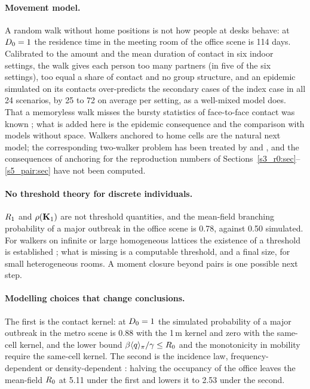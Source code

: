 \paragraph{Movement model.} A random walk without home positions is not how people at desks behave: at
$D_0=1$ the residence time in the meeting room of the office scene is 114 days. Calibrated to the amount and the
mean duration of contact in six indoor settings, the walk gives each person too many partners (in five of the six
settings), too equal a share of contact and no group structure, and an epidemic simulated on its contacts over-predicts the secondary cases of
the index case in all 24 scenarios, by 25 to 72\pct{} on average per setting, as a well-mixed model does. That a
memoryless walk misses the bursty statistics of face-to-face contact was known \citep{starnini2013modeling};
what is added here is the epidemic consequence and the comparison with models without space. Walkers anchored
to home cells are the natural next model; the corresponding two-walker problem has been treated by
\citet{kenkre2014theory} and \citet{sugaya2018analysis}, and the consequences of anchoring for the reproduction
numbers of Sections~\ref{s3_r0:sec}--\ref{s5_pair:sec} have not been computed.

\paragraph{No threshold theory for discrete individuals.} $R_1$ and $\rho(\mathbf{K}_1)$ are not threshold
quantities, and the mean-field branching probability of a major outbreak in the office scene is 0.78, against
0.50 simulated. For walkers on infinite or large homogeneous lattices the existence of a threshold is established
\citep{kesten2006phase,maia2007diffusive,carvalho2025generalized}; what is missing is a computable threshold, and a
final size, for small heterogeneous rooms. A moment closure beyond pairs \citep{keeling1999effects,kiss2017mathematics}
is one possible next step.

\paragraph{Modelling choices that change conclusions.} The first is the contact kernel: at $D_0=1$ the simulated
probability of a major outbreak in the metro scene is 0.88 with the 1\,m kernel and zero with the same-cell
kernel, and the lower bound $\beta\langle q\rangle_{\pi}/\gamma\le R_0$ and the monotonicity in mobility require the same-cell
kernel. The second is the incidence law, frequency-dependent or density-dependent
\citep{anderson1991infectious,keeling2008modeling}: halving the occupancy of the office leaves the mean-field $R_0$
at 5.11 under the first and lowers it to 2.53 under the second.

